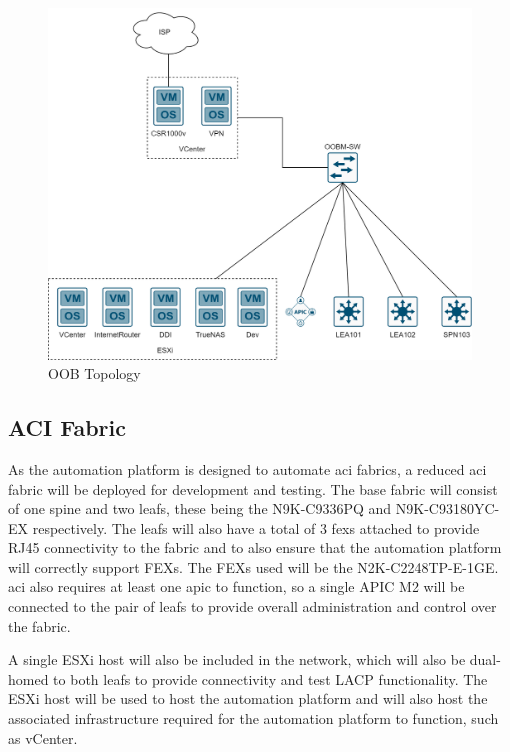 \begin{figure}[H]
    \centering

    \includegraphics[scale=0.25]{images/oob-topology.png}
    \caption{OOB
        Topology}
    \label{fig:oob-topology}
\end{figure}

\subsection{ACI Fabric}
\label{design:Testbed:network-design}
As the automation platform is designed to
automate \gls{aci} fabrics, a reduced \gls{aci} fabric will be deployed for
development and testing. The base fabric will consist of one spine and two
leafs, these being the N9K-C9336PQ and N9K-C93180YC-EX respectively. The leafs
will also have a total of 3 \gls{fex}s attached to provide RJ45 connectivity to
the fabric and to also ensure that the automation platform will correctly
support FEXs. The FEXs used will be the N2K-C2248TP-E-1GE. \gls{aci} also
requires at least one \gls{apic} to function, so a single APIC M2 will be
connected to the pair of leafs to provide overall administration and control
over the fabric.

A single ESXi host will also be included in the network,
which will also be dual-homed to both leafs to provide connectivity and
test LACP functionality. The ESXi host will be used to host the automation
platform and will also host the associated infrastructure required for the
automation platform to function, such as vCenter.

